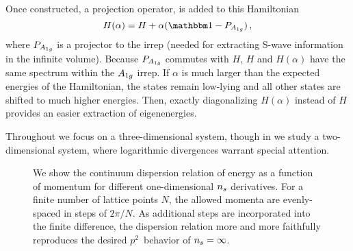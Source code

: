 Once constructed, a projection operator, is added to this Hamiltonian
\begin{equation}
    H(\alpha) = H + \alpha (\one - P_{\Aoneg}) \, ,
\end{equation}
where $P_{A_{1g}}$ is a projector to the \Aoneg irrep (needed for extracting S-wave information in the infinite volume).
Because $P_{A_{1g}}$ commutes with $H$, $H$ and $H(\alpha)$ have the same spectrum within the $A_{1g}$ irrep.
If $\alpha$ is much larger than the expected energies of the Hamiltonian, the \Aoneg states remain low-lying and all other states are shifted to much higher energies.
Then, exactly diagonalizing $H(\alpha)$ instead of $H$ provides an easier extraction of \Aoneg eigenenergies.

Throughout we focus on a three-dimensional system, though in  we study a two-dimensional system, where logarithmic divergences warrant special attention.

\begin{figure}
    
    \caption{We show the continuum dispersion relation of energy as a function of momentum for different one-dimensional ${n_s}$ derivatives.  For a finite number of lattice points $N$, the allowed momenta are evenly-spaced in steps of $2\pi/N$.
    As additional steps are incorporated into the finite difference, the dispersion relation more and more faithfully reproduces the desired $p^2$~behavior of ${n_s}=\infty$.
    }
    \label{fig:dispersion relation}
\end{figure}
